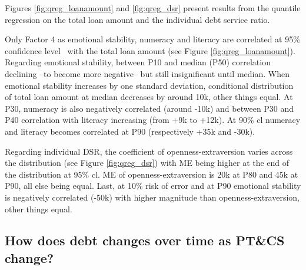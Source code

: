\documentclass[a4paper, 12pt, onecolumn]{article}
\newcommand{\sd}{standard deviation}
\newcommand{\aebe}{all else being equal}
\newcommand{\ote}{other things equal}
\newcommand{\cl}{confidence level}
\newcommand{\PTCS}{PT\&CS}
\begin{document}
Figures \ref{fig:qreg_loanamount} and \ref{fig:qreg_dsr} present results from the quantile regression on the total loan amount and the individual debt service ratio.

Only Factor 4 as emotional stability, numeracy and literacy are correlated at 95\% \cl~ with the total loan amount (see Figure \ref{fig:qreg_loanamount}).
Regarding emotional stability, between P10 and median (P50) correlation declining --to become more negative-- but still insignificant until median.
When emotional stability increases by one \sd, conditional distribution of total loan amount at median decreases by around \rupee10k, \ote.
At P30, numeracy is also negatively correlated (around -\rupee10k) and between P30 and P40 correlation with literacy increasing (from +\rupee9k to +\rupee12k).
At 90\% cl numeracy and literacy becomes correlated at P90 (respectively +\rupee35k and -\rupee30k).

Regarding individual DSR, the coefficient of openness-extraversion varies across the distribution (see Figure \ref{fig:qreg_dsr}) with ME being higher at the end of the distribution at 95\% cl.
ME of openness-extraversion is \rupee20k at P80 and \rupee45k at P90, \aebe.
Last, at 10\% risk of error and at P90 emotional stability is negatively correlated (-\rupee50k) with higher magnitude than openness-extraversion, \ote.










	\subsection{How does debt changes over time as \PTCS~ change?}
\end{document}
